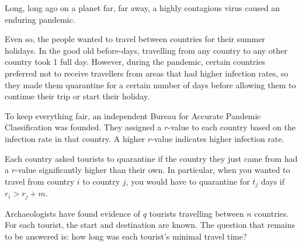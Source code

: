 








Long, long ago on a planet far, far away, a highly contagious virus caused an enduring pandemic.

Even so, the people wanted to travel between countries for their summer holidays.
In the good old before-days, travelling from any country to any other country took 1 full day.
However, during the pandemic,
certain countries preferred not to receive travellers from areas that had higher infection rates,
so they made them quarantine for a certain number of days before allowing them to continue their trip or start their holiday.

To keep everything fair, an independent Bureau for Accurate Pandemic Classification was founded. They assigned a $r$-value to each country based on the infection rate in that country. A higher $r$-value indicates higher infection rate.

Each country asked tourists to quarantine if the country they just came from had a $r$-value significantly higher than their own. In particular, when you wanted to travel from country $i$ to country $j$, you would have to quarantine for $t_j$ days if $r_i > r_j + m$.

Archaeologists have found evidence of $q$ tourists travelling between $n$
countries. For each tourist, the start and destination are known. The question
that remains to be answered is: how long was each tourist's minimal travel time?


